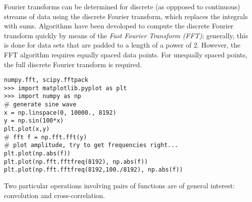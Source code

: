 \documentclass[12pt]{article}
\begin{document}
Fourier transforms can be determined for discrete (as oppposed to continuous)
streams of data using the discrete Fourier transform, which replaces the
integrals with sums. Algorithms have been devoloped to compute the discrete
Fourier transform quickly by means of the \emph{Fast Fourier Transform (FFT)};
generally, this is done for data sets that are padded to a length of a power
of 2. However, the FFT algorithm requires equally spaced data points. For
unequally spaced points, the full discrete Fourier transform is required.

\noindent
\texttt{numpy.fft, scipy.fftpack \\
>>> import matplotlib.pyplot as plt \\
>>> import numpy as np \\
$\#$ generate sine wave \\
x = np.linspace(0, 10000., 8192) \\
y = np.sin(100*x) \\
plt.plot(x,y) \\
$\#$ fft
f = np.fft.fft(y) \\
$\#$ plot amplitude, try to get frequencies right... \\
plt.plot(np.abs(f)) \\
plt.plot(np.fft.fftfreq(8192), np.abs(f)) \\
plt.plot(np.fft.fftfreq(8192,100./8192), np.abs(f))}

Two particular operations involving pairs of functions are of general interest:
convolution and cross-correlation.
\end{document}
